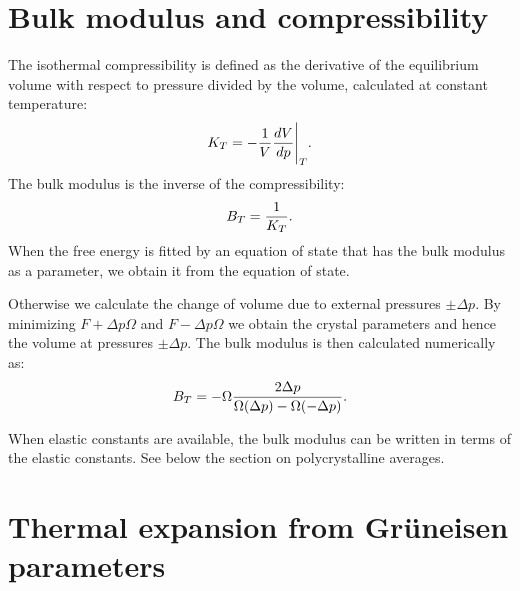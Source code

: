 \documentclass[12pt,a4paper,twoside]{report}
\begin{document}
\newpage
{\color{dark-blue}\chapter{Bulk modulus and compressibility}}
\color{black}

The isothermal compressibility is defined as the derivative of the 
equilibrium volume with respect to pressure divided by the volume,
calculated at constant temperature:
\begin{equation}
K_T = - {1 \over V} {d V \over d p}\Bigg|_T.
\end{equation}
The bulk modulus is the inverse of the compressibility:
\begin{equation}
B_T = {1 \over K_T}.
\end{equation}
When the free energy is fitted by an equation of state that has the
bulk modulus as a parameter, we obtain it from the equation of state.

Otherwise we calculate the change of volume due to external 
pressures $\pm \Delta p$. 
By minimizing $F + \Delta p \Omega$ and $F - \Delta p \Omega$ we obtain 
the crystal parameters and hence the volume at pressures 
$\pm \Delta p$. The bulk modulus is then calculated numerically as:
\begin{equation}
B_T = - \Omega { 2 \Delta p \over \Omega (\Delta p) - \Omega(-\Delta p)}.
\end{equation}

When elastic constants are available, the bulk modulus can be written
in terms of the elastic constants. See below the section on polycrystalline
averages.

\newpage
{\color{dark-blue}\chapter{Thermal expansion from Gr\"uneisen parameters}}
\color{black}
\end{document}
